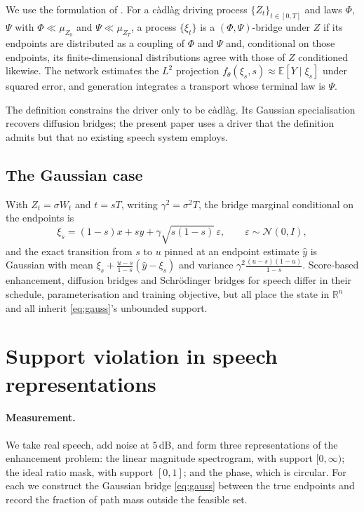\documentclass[11pt,a4paper]{article}
\def\R{\mathbb{R}}
\def\E{\mathbb{E}}
\def\xib{\xi}
\begin{document}
We use the formulation of \cite{companion}. For a c\`adl\`ag driving process
$\{Z_t\}_{t\in[0,T]}$ and laws $\Phi$, $\Psi$ with $\Phi\ll\mu_{Z_0}$ and
$\Psi\ll\mu_{Z_T}$, a process $\{\xib_t\}$ is a $(\Phi,\Psi)$-bridge under $Z$ if
its endpoints are distributed as a coupling of $\Phi$ and $\Psi$ and, conditional
on those endpoints, its finite-dimensional distributions agree with those of $Z$
conditioned likewise. The network estimates the $L^2$ projection
$f_\theta(\xib_s,s)\approx\E[Y\mid\xib_s]$ under squared error, and generation
integrates a transport whose terminal law is $\Psi$.

The definition constrains the driver only to be c\`adl\`ag. Its Gaussian
specialisation recovers diffusion bridges; the present paper uses a driver that
the definition admits but that no existing speech system employs.

\subsection{The Gaussian case}

With $Z_t=\sigma W_t$ and $t=sT$, writing $\gamma^2=\sigma^2T$, the bridge
marginal conditional on the endpoints is
\begin{equation}
\label{eq:gauss}
\xib_s=(1-s)x+sy+\gamma\sqrt{s(1-s)}\,\varepsilon,
\qquad \varepsilon\sim\mathcal{N}(0,I),
\end{equation}
and the exact transition from $s$ to $u$ pinned at an endpoint estimate
$\hat y$ is Gaussian with mean $\xib_s+\frac{u-s}{1-s}(\hat y-\xib_s)$ and
variance $\gamma^2\frac{(u-s)(1-u)}{1-s}$. Score-based enhancement, diffusion
bridges and Schr\"odinger bridges for speech differ in their schedule,
parameterisation and training objective, but all place the state in $\R^n$ and
all inherit \eqref{eq:gauss}'s unbounded support.

\section{Support violation in speech representations}
\label{sec:premise}

\paragraph{Measurement.} We take real speech, add noise at $5$\,dB, and form
three representations of the enhancement problem: the linear magnitude
spectrogram, with support $[0,\infty)$; the ideal ratio mask, with support
$[0,1]$; and the phase, which is circular. For each we construct the Gaussian
bridge \eqref{eq:gauss} between the true endpoints and record the fraction of
path mass outside the feasible set.
\end{document}

